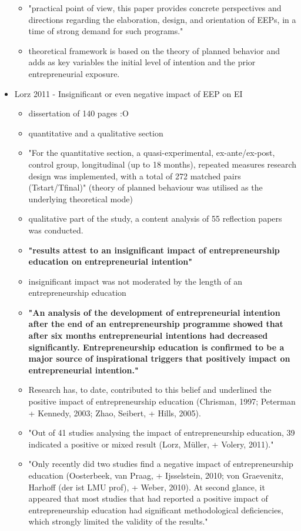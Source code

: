 \begin{itemize}
\begin{itemize}
\item "practical point of view, this paper provides concrete perspectives and directions regarding the elaboration, design, and orientation of EEPs, in a time of strong demand for such programs."
\item theoretical framework is based on the theory of planned behavior and adds as key variables the initial level of intention and the prior entrepreneurial exposure.
\end{itemize}
\item Lorz 2011 - Insignificant or even negative impact of EEP on EI
\begin{itemize}
\item dissertation of 140 pages :O
\item quantitative and a qualitative section
\item "For the quantitative section, a quasi-experimental, ex-ante/ex-post, control group, longitudinal (up to 18 months), repeated measures research design was implemented, with a total of 272 matched pairs (Tstart/Tfinal)" (theory of planned behaviour was utilised as the underlying theoretical mode)
\item qualitative part of the study, a content analysis of 55 reflection papers was conducted.
\item \textbf{"results attest to an insignificant impact of entrepreneurship education on entrepreneurial intention"}
\item insignificant impact was not moderated by the length of an entrepreneurship education
\item \textbf{"An analysis of the development of entrepreneurial intention after the end of an entrepreneurship programme showed that after six months entrepreneurial intentions had decreased significantly. Entrepreneurship education is confirmed to be a major source of inspirational triggers that positively impact on entrepreneurial intention."}
\item Research has, to date, contributed to this belief and underlined the positive impact of entrepreneurship education (Chrisman, 1997; Peterman + Kennedy, 2003; Zhao, Seibert, + Hills, 2005).
\item "Out of 41 studies analysing the impact of entrepreneurship education, 39 indicated a positive or mixed result (Lorz, Müller, + Volery, 2011)."
\item "Only recently did two studies find a negative impact of entrepreneurship education (Oosterbeek, van Praag, + Ijsselstein, 2010; von Graevenitz, Harhoff (der ist LMU prof), + Weber, 2010). At second glance, it appeared that most studies that had reported a positive impact of entrepreneurship education had significant methodological deficiencies, which strongly limited the validity of the results."

\end{itemize}
\end{itemize}
